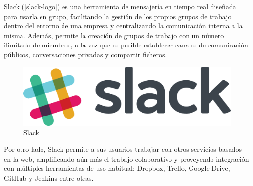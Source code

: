 Slack (\autoref{slack-logo}) es una herramienta de mensajería en tiempo real diseñada para usarla en grupo, facilitando la gestión de los propios grupos de trabajo dentro del entorno de una empresa y centralizando la comunicación interna a la misma\cite{santamaria2015}. Además, permite la creación de grupos de trabajo con un número ilimitado de miembros, a la vez que es posible establecer canales de comunicación públicos, conversaciones privadas y compartir ficheros.

\begin{figure}[htbp]
	\centering
	\includegraphics[width=0.80\linewidth]
	{entorno/figuras/Slack.png}
	\caption{Slack}
	\label{slack-logo}
\end{figure}

Por otro lado, Slack permite a sus usuarios trabajar con otros servicios basados en la web, amplificando aún más el trabajo colaborativo y proveyendo integración con múltiples herramientas de uso habitual: Dropbox, Trello, Google Drive, GitHub y Jenkins entre otras.


\endinput